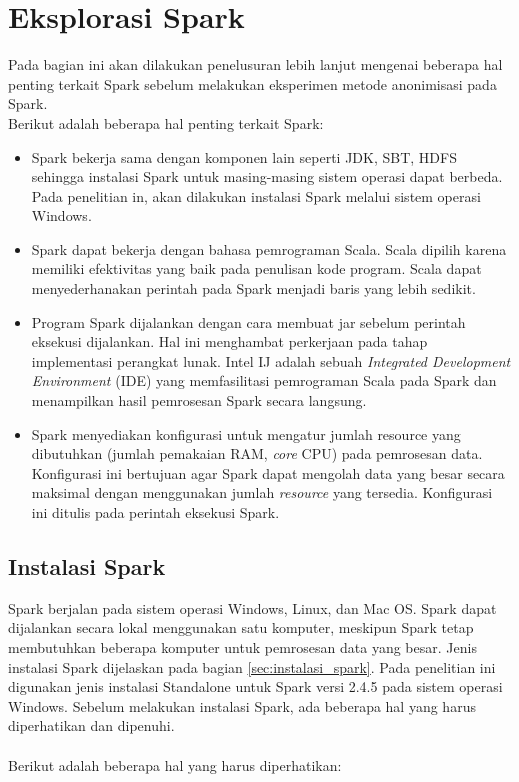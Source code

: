 \newpage
\section{Eksplorasi Spark}
Pada bagian ini akan dilakukan penelusuran lebih lanjut mengenai beberapa hal penting terkait Spark sebelum melakukan eksperimen metode anonimisasi pada Spark.\\ 

\noindent Berikut adalah beberapa hal penting terkait Spark:
\begin{itemize}

\item Spark bekerja sama dengan komponen lain seperti JDK, SBT, HDFS sehingga instalasi Spark untuk masing-masing sistem operasi dapat berbeda. Pada penelitian in, akan dilakukan instalasi Spark melalui sistem operasi Windows. 

\item Spark dapat bekerja dengan bahasa pemrograman Scala. Scala dipilih karena memiliki efektivitas yang baik pada penulisan kode program. Scala dapat menyederhanakan perintah pada Spark menjadi baris yang lebih sedikit.

\item Program Spark dijalankan dengan cara membuat jar sebelum perintah eksekusi dijalankan. Hal ini menghambat perkerjaan pada tahap implementasi perangkat lunak. Intel IJ adalah sebuah \textit{Integrated Development Environment} (IDE) yang memfasilitasi pemrograman Scala pada Spark dan menampilkan hasil pemrosesan Spark  secara langsung.

\item Spark menyediakan konfigurasi untuk mengatur jumlah resource  yang dibutuhkan (jumlah pemakaian RAM, \textit{core} CPU) pada pemrosesan data. Konfigurasi ini bertujuan agar Spark dapat mengolah data yang besar secara maksimal dengan menggunakan jumlah \textit{resource} yang tersedia. Konfigurasi ini ditulis pada perintah eksekusi Spark.
 

\end{itemize}



\subsection{Instalasi Spark}
Spark berjalan pada sistem operasi Windows, Linux, dan Mac OS. Spark dapat dijalankan secara lokal menggunakan satu komputer, meskipun Spark tetap membutuhkan beberapa komputer untuk pemrosesan data yang besar. Jenis instalasi Spark dijelaskan pada bagian \ref{sec:instalasi_spark}. Pada penelitian ini digunakan jenis instalasi Standalone untuk Spark versi 2.4.5 pada sistem operasi Windows. Sebelum melakukan instalasi Spark, ada beberapa hal yang harus diperhatikan dan dipenuhi. 
\\\\
\noindent Berikut adalah beberapa hal yang harus diperhatikan:

